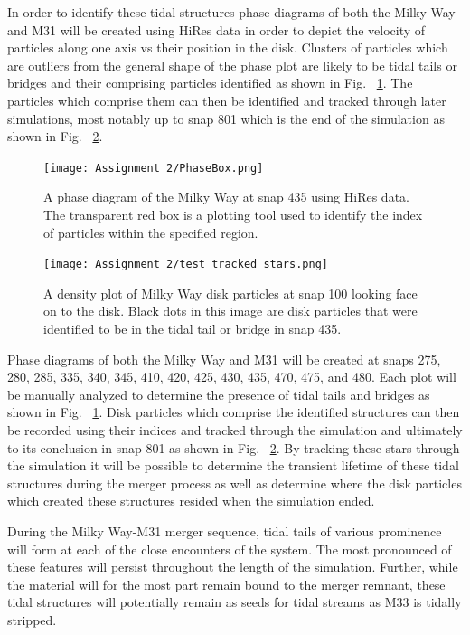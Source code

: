 \documentclass[fleqn,usenatbib]{mnras}
\begin{document}
In order to identify these tidal structures phase diagrams of both the Milky Way and M31 will be created using HiRes data in order to depict the velocity of particles along one axis vs their position in the disk. Clusters of particles which are outliers from the general shape of the phase plot are likely to be tidal tails or bridges and their comprising particles identified as shown in Fig. ~\ref{fig:Phase_box}. The particles which comprise them can then be identified and tracked through later simulations, most notably up to snap 801 which is the end of the simulation as shown in Fig. ~\ref{fig:Tracked_Stars}.

\begin{figure}
	\texttt{[image: Assignment 2/PhaseBox.png]}
    \caption{A phase diagram of the Milky Way at snap 435 using HiRes data. The transparent red box is a plotting tool used to identify the index of particles within the specified region.}
    \label{fig:Phase_box}
\end{figure}

\begin{figure}
	\texttt{[image: Assignment 2/test\_tracked\_stars.png]}
    \caption{A density plot of Milky Way disk particles at snap 100 looking face on to the disk. Black dots in this image are disk particles that were identified to be in the tidal tail or bridge in snap 435.}
    \label{fig:Tracked_Stars}
\end{figure}

 Phase diagrams of both the Milky Way and M31 will be created at snaps 275, 280, 285, 335, 340, 345, 410, 420, 425, 430, 435, 470, 475, and 480. Each plot will be manually analyzed to determine the presence of tidal tails and bridges as shown in Fig. ~\ref{fig:Phase_box}. Disk particles which comprise the identified structures can then be recorded using their indices and tracked through the simulation and ultimately to its conclusion in snap 801 as shown in Fig. ~\ref{fig:Tracked_Stars}. By tracking these stars through the simulation it will be possible to determine the transient lifetime of these tidal structures during the merger process as well as determine where the disk particles which created these structures resided when the simulation ended.

During the Milky Way-M31 merger sequence, tidal tails of various prominence will form at each of the close encounters of the system. 
The most pronounced of these features will persist throughout the length of the simulation. 
Further, while the material will for the most part remain bound to the merger remnant, these tidal structures will potentially remain as seeds for tidal streams as M33 is tidally stripped.



 

\bsp	%
\label{lastpage}
\end{document}
